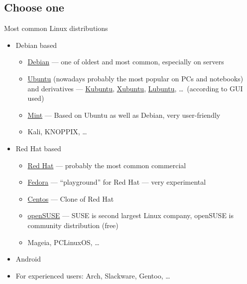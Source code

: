 \documentclass[hyperref={bookmarks=true, unicode=true, colorlinks=true, pdftitle={Linux, command line and MetaCentrum}, plainpages=false, pdfauthor={Vojtech Zeisek}, pdfsubject={Course about use of Linux command line, writing shell scripts and using MetaCentrum of CESNET}, pdfcreator={XeLaTeX, http://www.xelatex.org/}, pdfkeywords={Linux, GNU, BASH, shell, command line, MetaCentrum}, linkcolor=Sienna, anchorcolor=black, citecolor=green, filecolor=magenta, menucolor=Sienna, urlcolor=cyan, pdftex}, compress, ucs, xelatex, xcolor=svgnames, 11pt]{beamer}
\begin{document}
\subsection{Choose one}

\begin{frame}{Most common Linux distributions}
\begin{itemize}
  \item Debian based
  \begin{itemize}
    \item \href{https://www.debian.org/}{Debian} --- one of oldest and most common, especially on servers
    \item \href{http://www.ubuntu.com/}{Ubuntu} (nowadays probably the most popular on PCs and notebooks) and derivatives --- \href{http://www.kubuntu.org/}{Kubuntu}, \href{http://xubuntu.org/}{Xubuntu}, \href{http://lubuntu.net/}{Lubuntu}, \ldots~(according to GUI used)
    \item \href{http://linuxmint.com/}{Mint} --- Based on Ubuntu as well as Debian, very user-friendly
    \item Kali, KNOPPIX, \ldots
  \end{itemize}
  \item Red Hat based
  \begin{itemize}
    \item \href{http://www.redhat.com/}{Red Hat} --- probably the most common commercial
    \item \href{https://getfedora.org/}{Fedora} --- ``playground'' for Red Hat --- very experimental
    \item \href{https://www.centos.org/}{Centos} --- Clone of Red Hat
    \item \href{https://www.opensuse.org/}{openSUSE} --- SUSE is second largest Linux company, openSUSE is community distribution (free)
    \item Mageia, PCLinuxOS, \ldots
  \end{itemize}
  \item Android
  \item For experienced users: Arch, Slackware, Gentoo, \ldots
\end{itemize}
\end{frame}
\end{document}
